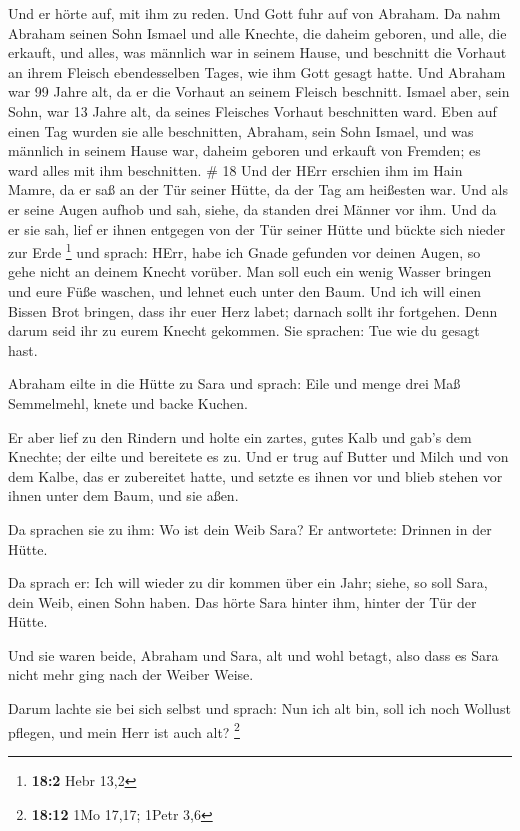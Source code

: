  Und er hörte auf, mit ihm zu reden. Und Gott fuhr auf von
Abraham.  Da nahm Abraham seinen Sohn Ismael und alle
Knechte, die daheim geboren, und alle, die erkauft, und alles, was
männlich war in seinem Hause, und beschnitt die Vorhaut an ihrem Fleisch
ebendesselben Tages, wie ihm Gott gesagt hatte.  Und
Abraham war 99 Jahre alt, da er die Vorhaut an seinem Fleisch beschnitt.
 Ismael aber, sein Sohn, war 13 Jahre alt, da seines
Fleisches Vorhaut beschnitten ward.  Eben auf einen Tag
wurden sie alle beschnitten, Abraham, sein Sohn Ismael, 
und was männlich in seinem Hause war, daheim geboren und erkauft von
Fremden; es ward alles mit ihm beschnitten. \# 18  Und der
HErr erschien ihm im Hain Mamre, da er saß an der Tür seiner Hütte, da
der Tag am heißesten war.  Und als er seine Augen aufhob und
sah, siehe, da standen drei Männer vor ihm. Und da er sie sah, lief er
ihnen entgegen von der Tür seiner Hütte und bückte sich nieder zur Erde
\footnote{\textbf{18:2} Hebr 13,2}  und sprach: HErr, habe
ich Gnade gefunden vor deinen Augen, so gehe nicht an deinem Knecht
vorüber.  Man soll euch ein wenig Wasser bringen und eure
Füße waschen, und lehnet euch unter den Baum.  Und ich will
einen Bissen Brot bringen, dass ihr euer Herz labet; darnach sollt ihr
fortgehen. Denn darum seid ihr zu eurem Knecht gekommen. Sie sprachen:
Tue wie du gesagt hast.

 Abraham eilte in die Hütte zu Sara und sprach: Eile und
menge drei Maß Semmelmehl, knete und backe Kuchen.

 Er aber lief zu den Rindern und holte ein zartes, gutes
Kalb und gab's dem Knechte; der eilte und bereitete es zu. 
Und er trug auf Butter und Milch und von dem Kalbe, das er zubereitet
hatte, und setzte es ihnen vor und blieb stehen vor ihnen unter dem
Baum, und sie aßen.

 Da sprachen sie zu ihm: Wo ist dein Weib Sara? Er
antwortete: Drinnen in der Hütte.

 Da sprach er: Ich will wieder zu dir kommen über ein Jahr;
siehe, so soll Sara, dein Weib, einen Sohn haben. Das hörte Sara hinter
ihm, hinter der Tür der Hütte.

 Und sie waren beide, Abraham und Sara, alt und wohl
betagt, also dass es Sara nicht mehr ging nach der Weiber Weise.

 Darum lachte sie bei sich selbst und sprach: Nun ich alt
bin, soll ich noch Wollust pflegen, und mein Herr ist auch alt?
\footnote{\textbf{18:12} 1Mo 17,17; 1Petr 3,6}

